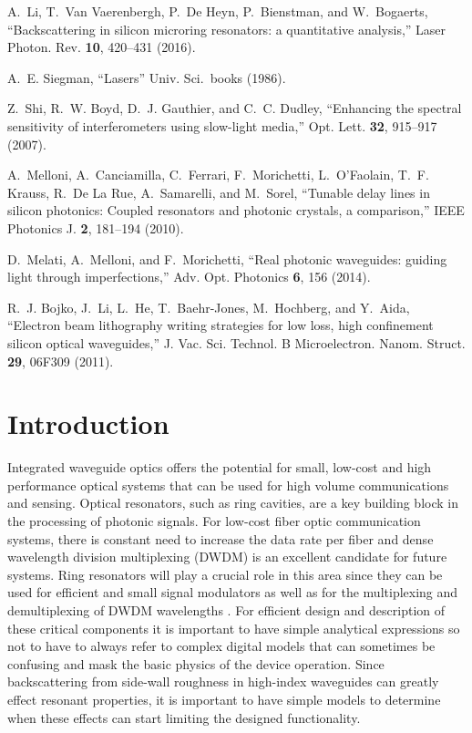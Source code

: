 \documentclass[10pt]{article}
\begin{document}
\begin{thebibliography}{10}
A.~Li, T.~{Van Vaerenbergh}, P.~{De Heyn}, P.~Bienstman, and W.~Bogaerts,
  \enquote{{Backscattering in silicon microring resonators: a quantitative
  analysis},} Laser Photon. Rev. \textbf{10}, 420--431 (2016).

A.~E. Siegman, \enquote{{Lasers}} Univ. Sci.~books (1986).

Z.~Shi, R.~W. Boyd, D.~J. Gauthier, and C.~C. Dudley, \enquote{{Enhancing the
  spectral sensitivity of interferometers using slow-light media},} Opt. Lett.
  \textbf{32}, 915--917 (2007).

A.~Melloni, A.~Canciamilla, C.~Ferrari, F.~Morichetti, L.~O'Faolain, T.~F.
  Krauss, R.~{De La Rue}, A.~Samarelli, and M.~Sorel, \enquote{{Tunable delay
  lines in silicon photonics: Coupled resonators and photonic crystals, a
  comparison},} IEEE Photonics J. \textbf{2}, 181--194 (2010).

D.~Melati, A.~Melloni, and F.~Morichetti, \enquote{{Real photonic waveguides:
  guiding light through imperfections},} Adv. Opt. Photonics \textbf{6}, 156
  (2014).

R.~J. Bojko, J.~Li, L.~He, T.~Baehr-Jones, M.~Hochberg, and Y.~Aida,
  \enquote{{Electron beam lithography writing strategies for low loss, high
  confinement silicon optical waveguides},} J. Vac. Sci. Technol. B
  Microelectron. Nanom. Struct. \textbf{29}, 06F309 (2011).
\end{thebibliography}

%
%

\section{Introduction}
Integrated waveguide optics offers the potential for small, low-cost and high performance optical systems that can be used for high volume communications and sensing.
Optical resonators, such as ring cavities, are a key building block in the processing of photonic signals.
For low-cost fiber optic communication systems, there is constant need to increase the data rate per fiber and dense wavelength division multiplexing (DWDM) is an excellent candidate for future systems.
Ring resonators will play a crucial role in this area since they can be used for efficient and small signal modulators as well as for the multiplexing and demultiplexing of  DWDM wavelengths  \cite{Little1997a,Bogaerts:12}.
For efficient design and description of these critical components it is important to have simple analytical expressions so not to have to always refer to complex digital models that can sometimes be confusing and mask the basic physics of the device operation.
Since backscattering from side-wall roughness in high-index waveguides can greatly effect resonant properties, it is important to have simple models to determine when these effects can start limiting the designed functionality. \cite{Weiss:95,PhysRevLett.99.173603,Little1997,Borselli2004,Canciamilla2009,Morichetti2010c,Ballesteros2011,Li2016}
\end{document}
